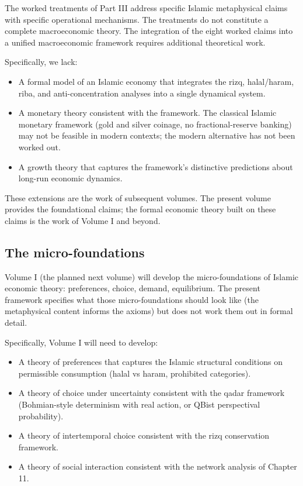 The worked treatments of Part III address specific Islamic
metaphysical claims with specific operational mechanisms. The
treatments do not constitute a complete macroeconomic theory.
The integration of the eight worked claims into a unified
macroeconomic framework requires additional theoretical work.

Specifically, we lack:

\begin{itemize}[leftmargin=2em]
    \item A formal model of an Islamic economy that integrates
    the rizq, halal/haram, riba, and anti-concentration analyses
    into a single dynamical system.
    \item A monetary theory consistent with the framework. The
    classical Islamic monetary framework (gold and silver
    coinage, no fractional-reserve banking) may not be feasible
    in modern contexts; the modern alternative has not been
    worked out.
    \item A growth theory that captures the framework's
    distinctive predictions about long-run economic dynamics.
\end{itemize}

These extensions are the work of subsequent volumes. The present
volume provides the foundational claims; the formal economic
theory built on these claims is the work of Volume I and beyond.

\subsection{The micro-foundations}

Volume I (the planned next volume) will develop the
micro-foundations of Islamic economic theory: preferences,
choice, demand, equilibrium. The present framework specifies
what those micro-foundations should look like (the metaphysical
content informs the axioms) but does not work them out in formal
detail.

Specifically, Volume I will need to develop:

\begin{itemize}[leftmargin=2em]
    \item A theory of preferences that captures the Islamic
    structural conditions on permissible consumption (halal vs
    haram, prohibited categories).
    \item A theory of choice under uncertainty consistent with the
    qadar framework (Bohmian-style determinism with real action,
    or QBist perspectival probability).
    \item A theory of intertemporal choice consistent with the
    rizq conservation framework.
    \item A theory of social interaction consistent with the
    network analysis of Chapter 11.
\end{itemize}

